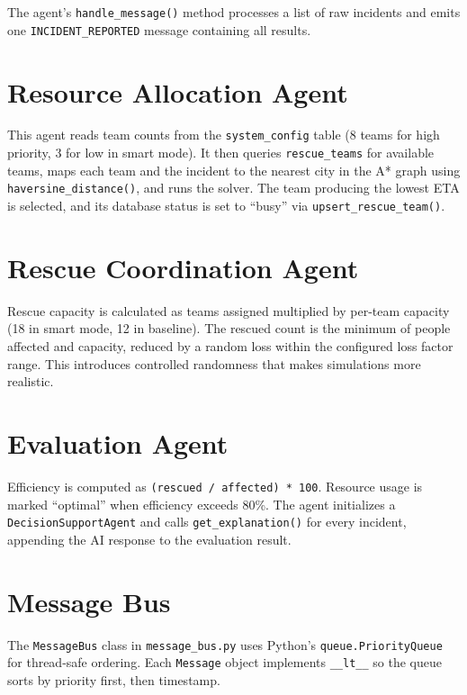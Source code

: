 The agent's \texttt{handle\_message()} method processes a list of raw incidents and emits one \texttt{INCIDENT\_REPORTED} message containing all results.

\section{Resource Allocation Agent}
\label{sec:impl_resource_agent}

This agent reads team counts from the \texttt{system\_config} table (8 teams for high priority, 3 for low in smart mode). It then queries \texttt{rescue\_teams} for available teams, maps each team and the incident to the nearest city in the A* graph using \texttt{haversine\_distance()}, and runs the solver. The team producing the lowest ETA is selected, and its database status is set to ``busy'' via \texttt{upsert\_rescue\_team()}.

\section{Rescue Coordination Agent}
\label{sec:impl_rescue_agent}

Rescue capacity is calculated as teams assigned multiplied by per-team capacity (18 in smart mode, 12 in baseline). The rescued count is the minimum of people affected and capacity, reduced by a random loss within the configured loss factor range. This introduces controlled randomness that makes simulations more realistic.

\section{Evaluation Agent}
\label{sec:impl_eval_agent}

Efficiency is computed as \texttt{(rescued / affected) * 100}. Resource usage is marked ``optimal'' when efficiency exceeds 80\%. The agent initializes a \texttt{DecisionSupportAgent} and calls \texttt{get\_explanation()} for every incident, appending the AI response to the evaluation result.

\section{Message Bus}
\label{sec:impl_message_bus}

The \texttt{MessageBus} class in \texttt{message\_bus.py} uses Python's \texttt{queue.PriorityQueue} for thread-safe ordering. Each \texttt{Message} object implements \texttt{\_\_lt\_\_} so the queue sorts by priority first, then timestamp.

